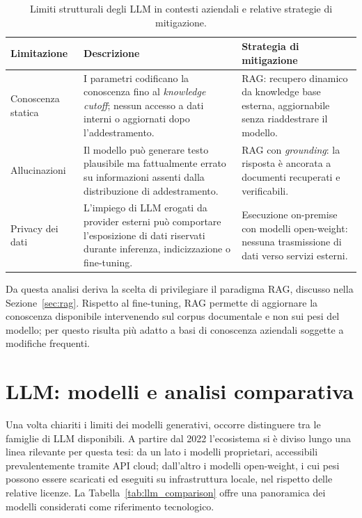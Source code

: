 \begin{table}[ht]
  \centering
  \caption{Limiti strutturali degli LLM in contesti aziendali e relative strategie di mitigazione.}
  \label{tab:llm_limits}
  \small
  \begin{tabularx}{\textwidth}{L{3cm}YY}
    \toprule
    \textbf{Limitazione} & \textbf{Descrizione} & \textbf{Strategia di mitigazione} \\
    \midrule
    Conoscenza statica
      & I parametri codificano la conoscenza fino al \textit{knowledge cutoff};
        nessun accesso a dati interni o aggiornati dopo l'addestramento.
      & RAG: recupero dinamico da knowledge base esterna, aggiornabile
        senza riaddestrare il modello. \\
    \addlinespace
    Allucinazioni~\cite{ji2023survey}
      & Il modello può generare testo plausibile ma fattualmente errato su informazioni
        assenti dalla distribuzione di addestramento.
      & RAG con \textit{grounding}: la risposta è ancorata a documenti
        recuperati e verificabili. \\
    \addlinespace
    Privacy dei dati
      & L’impiego di LLM erogati da provider esterni può comportare l’esposizione 
      di dati riservati durante inferenza, indicizzazione o fine-tuning.
      & Esecuzione on-premise con modelli open-weight: nessuna trasmissione
        di dati verso servizi esterni. \\
    \bottomrule
  \end{tabularx}
\end{table}

Da questa analisi deriva la scelta di privilegiare il paradigma RAG, discusso
nella Sezione~\ref{sec:rag}. Rispetto al fine-tuning, RAG permette di aggiornare
la conoscenza disponibile intervenendo sul corpus documentale e non sui pesi del
modello; per questo risulta più adatto a basi di conoscenza aziendali soggette a
modifiche frequenti.

\section{LLM: modelli e analisi comparativa}
\label{sec:llm}

Una volta chiariti i limiti dei modelli generativi, occorre distinguere tra le
famiglie di LLM disponibili. A partire dal 2022 l'ecosistema si è diviso lungo
una linea rilevante per questa tesi: da un lato i modelli proprietari, accessibili
prevalentemente tramite API cloud; dall'altro i modelli open-weight, i cui pesi
possono essere scaricati ed eseguiti su infrastruttura locale, nel rispetto delle
relative licenze. La Tabella~\ref{tab:llm_comparison} offre una panoramica dei
modelli considerati come riferimento tecnologico.

